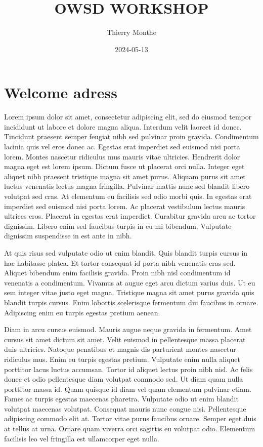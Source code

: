 \documentclass[
]{book}
\title{OWSD WORKSHOP}
\author{Thierry Monthe}
\date{2024-05-13}
\begin{document}
\maketitle

{
\setcounter{tocdepth}{1}
\tableofcontents
}
\hypertarget{welcome-adress}{%
\chapter{Welcome adress}\label{welcome-adress}}

Lorem ipsum dolor sit amet, consectetur adipiscing elit, sed do eiusmod tempor incididunt ut labore et dolore magna aliqua. Interdum velit laoreet id donec. Tincidunt praesent semper feugiat nibh sed pulvinar proin gravida. Condimentum lacinia quis vel eros donec ac. Egestas erat imperdiet sed euismod nisi porta lorem. Montes nascetur ridiculus mus mauris vitae ultricies. Hendrerit dolor magna eget est lorem ipsum. Dictum fusce ut placerat orci nulla. Integer eget aliquet nibh praesent tristique magna sit amet purus. Aliquam purus sit amet luctus venenatis lectus magna fringilla. Pulvinar mattis nunc sed blandit libero volutpat sed cras. At elementum eu facilisis sed odio morbi quis. In egestas erat imperdiet sed euismod nisi porta lorem. Ac placerat vestibulum lectus mauris ultrices eros. Placerat in egestas erat imperdiet. Curabitur gravida arcu ac tortor dignissim. Libero enim sed faucibus turpis in eu mi bibendum. Vulputate dignissim suspendisse in est ante in nibh.

At quis risus sed vulputate odio ut enim blandit. Quis blandit turpis cursus in hac habitasse platea. Et tortor consequat id porta nibh venenatis cras sed. Aliquet bibendum enim facilisis gravida. Proin nibh nisl condimentum id venenatis a condimentum. Vivamus at augue eget arcu dictum varius duis. Ut eu sem integer vitae justo eget magna. Tristique magna sit amet purus gravida quis blandit turpis cursus. Enim lobortis scelerisque fermentum dui faucibus in ornare. Adipiscing enim eu turpis egestas pretium aenean.

Diam in arcu cursus euismod. Mauris augue neque gravida in fermentum. Amet cursus sit amet dictum sit amet. Velit euismod in pellentesque massa placerat duis ultricies. Natoque penatibus et magnis dis parturient montes nascetur ridiculus mus. Enim eu turpis egestas pretium. Vulputate enim nulla aliquet porttitor lacus luctus accumsan. Tortor id aliquet lectus proin nibh nisl. Ac felis donec et odio pellentesque diam volutpat commodo sed. Ut diam quam nulla porttitor massa id. Quam quisque id diam vel quam elementum pulvinar etiam. Fames ac turpis egestas maecenas pharetra. Vulputate odio ut enim blandit volutpat maecenas volutpat. Consequat mauris nunc congue nisi. Pellentesque adipiscing commodo elit at. Tortor vitae purus faucibus ornare. Semper eget duis at tellus at urna. Ornare quam viverra orci sagittis eu volutpat odio. Elementum facilisis leo vel fringilla est ullamcorper eget nulla.
\end{document}
